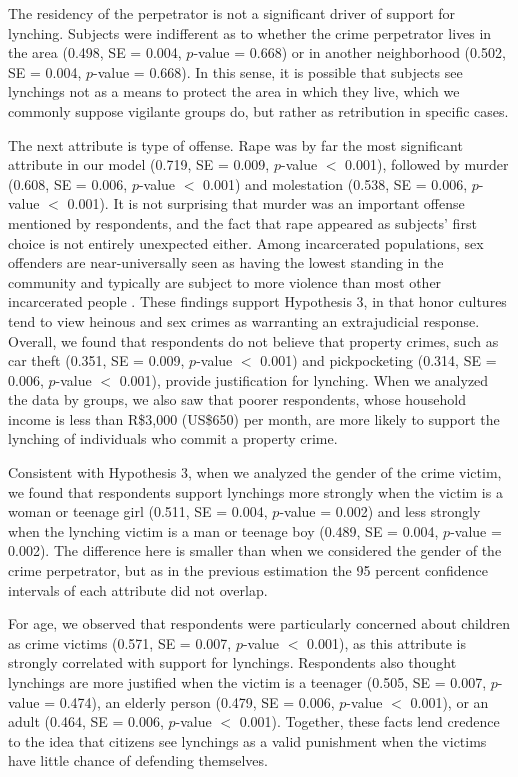 \documentclass[12pt,a4paper]{article}
\begin{document}
The residency of the perpetrator is not a significant driver of support for lynching. Subjects were indifferent as to whether the crime perpetrator lives in the area (0.498, SE = 0.004, $p$-value = 0.668) or in another neighborhood (0.502, SE = 0.004, $p$-value = 0.668). In this sense, it is possible that subjects see lynchings not as a means to protect the area in which they live, which we commonly suppose vigilante groups do, but rather as retribution in specific cases. 

The next attribute is type of offense. Rape was by far the most significant attribute in our model (0.719, SE = 0.009, $p$-value $<$ 0.001), followed by murder (0.608, SE = 0.006, $p$-value $<$ 0.001) and molestation (0.538, SE = 0.006, $p$-value $<$ 0.001). It is not surprising that murder was an important offense mentioned by respondents, and the fact that rape appeared as subjects' first choice is not entirely unexpected either. Among incarcerated populations, sex offenders are near-universally seen as having the lowest standing in the community and typically are subject to more violence than most other incarcerated people \citep{fleisher2009myth}. These findings support Hypothesis 3, in that honor cultures tend to view heinous and sex crimes as warranting an extrajudicial response. Overall, we found that respondents do not believe that property crimes, such as car theft (0.351, SE = 0.009, $p$-value $<$ 0.001) and pickpocketing (0.314, SE = 0.006, $p$-value $<$ 0.001), provide justification for lynching. When we analyzed the data by groups, we also saw that poorer respondents, whose household income is less than R\$3,000 (US\$650) per month, are more likely to support the lynching of individuals who commit a property crime. 

Consistent with Hypothesis 3, when we analyzed the gender of the crime victim, we found that respondents support lynchings more strongly when the victim is a woman or teenage girl (0.511, SE = 0.004, $p$-value = 0.002) and less strongly when the lynching victim is a man or teenage boy (0.489, SE = 0.004, $p$-value = 0.002). The difference here is smaller than when we considered the gender of the crime perpetrator, but as in the previous estimation the 95 percent confidence intervals of each attribute did not overlap. 

For age, we observed that respondents were particularly concerned about children as crime victims (0.571, SE = 0.007, $p$-value $<$ 0.001), as this attribute is strongly correlated with support for lynchings. Respondents also thought lynchings are more justified when the victim is a teenager (0.505, SE = 0.007, $p$-value = 0.474), an elderly person (0.479, SE = 0.006, $p$-value $<$ 0.001), or an adult (0.464, SE = 0.006, $p$-value $<$ 0.001). Together, these facts lend credence to the idea that citizens see lynchings as a valid punishment when the victims have little chance of defending themselves.
\end{document}
